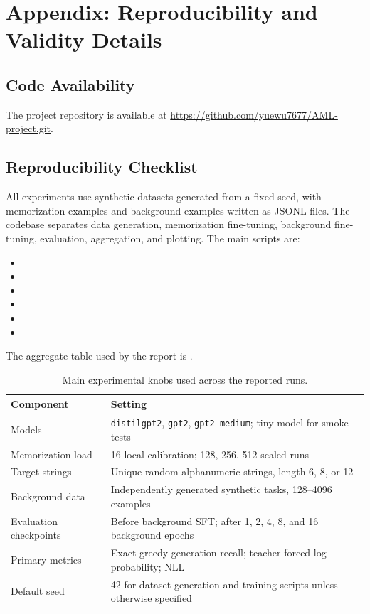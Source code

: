 \documentclass{article}
\begin{document}



\clearpage
\appendix
\section{Appendix: Reproducibility and Validity Details}

\subsection{Code Availability}
The project repository is available at \url{https://github.com/yuewu7677/AML-project.git}.

\subsection{Reproducibility Checklist}
All experiments use synthetic datasets generated from a fixed seed, with memorization examples and background examples written as JSONL files. The codebase separates data generation, memorization fine-tuning, background fine-tuning, evaluation, aggregation, and plotting. The main scripts are:
\begin{itemize}[leftmargin=*]
    \item {}
    \item {}
    \item {}
    \item {}
    \item {}
    \item {}
\end{itemize}
The aggregate table used by the report is .

\begin{table}[h]
\centering
\small
\caption{Main experimental knobs used across the reported runs.}
\label{tab:appendix-config}
\begin{tabular}{ll}
\toprule
Component & Setting \\
\midrule
Models & \texttt{distilgpt2}, \texttt{gpt2}, \texttt{gpt2-medium}; tiny model for smoke tests \\
Memorization load & 16 local calibration; 128, 256, 512 scaled runs \\
Target strings & Unique random alphanumeric strings, length 6, 8, or 12 \\
Background data & Independently generated synthetic tasks, 128--4096 examples \\
Evaluation checkpoints & Before background SFT; after 1, 2, 4, 8, and 16 background epochs \\
Primary metrics & Exact greedy-generation recall; teacher-forced log probability; NLL \\
Default seed & 42 for dataset generation and training scripts unless otherwise specified \\
\bottomrule
\end{tabular}
\end{table}
\end{document}
